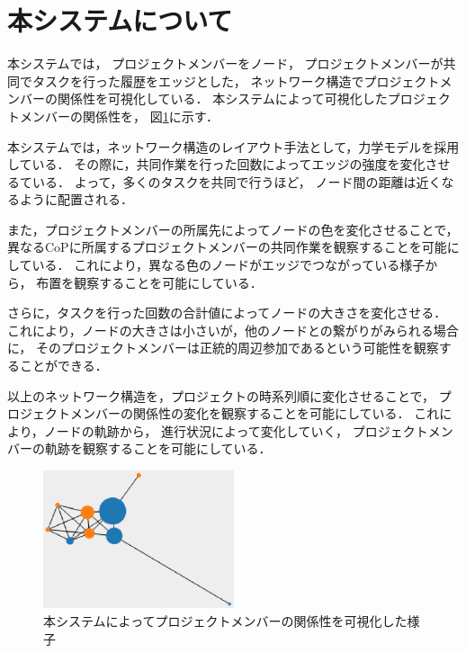 \documentclass[submit,techrep]{ipsj}
\begin{document}
\section{本システムについて}
\label{system-map}

本システムでは，
プロジェクトメンバーをノード，
プロジェクトメンバーが共同でタスクを行った履歴をエッジとした，
ネットワーク構造でプロジェクトメンバーの関係性を可視化している．
本システムによって可視化したプロジェクトメンバーの関係性を，
図\ref{cop-map-graph}に示す．

本システムでは，ネットワーク構造のレイアウト手法として，力学モデルを採用している．
その際に，共同作業を行った回数によってエッジの強度を変化させるている．
よって，多くのタスクを共同で行うほど，
ノード間の距離は近くなるように配置される．

また，プロジェクトメンバーの所属先によってノードの色を変化させることで，
異なるCoPに所属するプロジェクトメンバーの共同作業を観察することを可能にしている．
これにより，異なる色のノードがエッジでつながっている様子から，
布置を観察することを可能にしている．

さらに，タスクを行った回数の合計値によってノードの大きさを変化させる．
これにより，ノードの大きさは小さいが，他のノードとの繋がりがみられる場合に，
そのプロジェクトメンバーは正統的周辺参加であるという可能性を観察することができる．

以上のネットワーク構造を，プロジェクトの時系列順に変化させることで，
プロジェクトメンバーの関係性の変化を観察することを可能にしている．
これにより，ノードの軌跡から，
進行状況によって変化していく，
プロジェクトメンバーの軌跡を観察することを可能にしている．


\begin{figure}[h]
  \centering
  \includegraphics[width=0.5\textwidth]{img/cop-map-graph.eps}
  \caption{本システムによってプロジェクトメンバーの関係性を可視化した様子}
  \label{cop-map-graph}
\end{figure}
\end{document}
